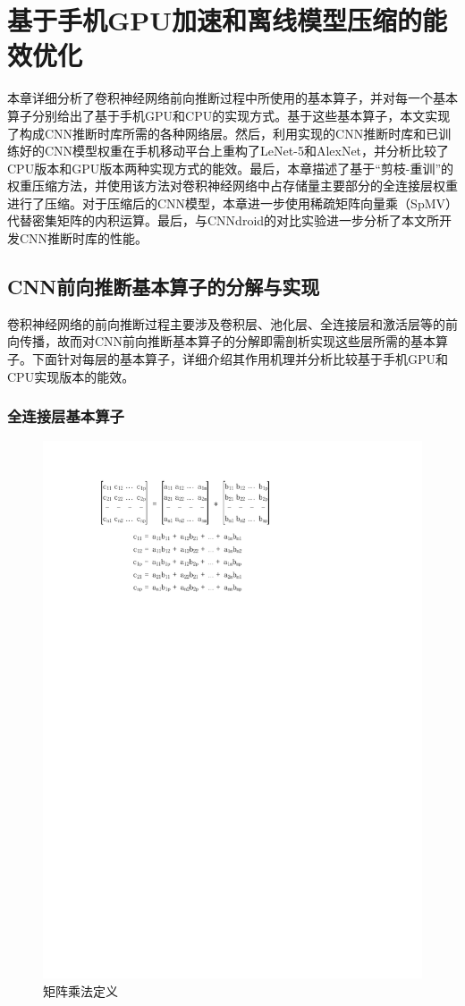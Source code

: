 \chapter{基于手机GPU加速和离线模型压缩的能效优化}
\label{chapter:chapter3}

本章详细分析了卷积神经网络前向推断过程中所使用的基本算子，并对每一个基本算子分别给出了基于手机GPU和CPU的实现方式。基于这些基本算子，本文实现了构成CNN推断时库所需的各种网络层。然后，利用实现的CNN推断时库和已训练好的CNN模型权重在手机移动平台上重构了LeNet-5和AlexNet，并分析比较了CPU版本和GPU版本两种实现方式的能效。最后，本章描述了基于“剪枝-重训”的权重压缩方法，并使用该方法对卷积神经网络中占存储量主要部分的全连接层权重进行了压缩。对于压缩后的CNN模型，本章进一步使用稀疏矩阵向量乘（SpMV）代替密集矩阵的内积运算。最后，与CNNdroid\cite{latifi2016cnndroid}的对比实验进一步分析了本文所开发CNN推断时库的性能。

\section{CNN前向推断基本算子的分解与实现}
\label{chapter:chapter3-1}
卷积神经网络的前向推断过程主要涉及卷积层、池化层、全连接层和激活层等的前向传播，故而对CNN前向推断基本算子的分解即需剖析实现这些层所需的基本算子。下面针对每层的基本算子，详细介绍其作用机理并分析比较基于手机GPU和CPU实现版本的能效。

\subsection{全连接层基本算子}

\begin{figure}[htbp]
    \begin{center}
    \includegraphics[height=0.5\textwidth]{figures/mat.pdf}
    \end{center}
    \caption{矩阵乘法定义}\label{figure:figure8}
\end{figure}

